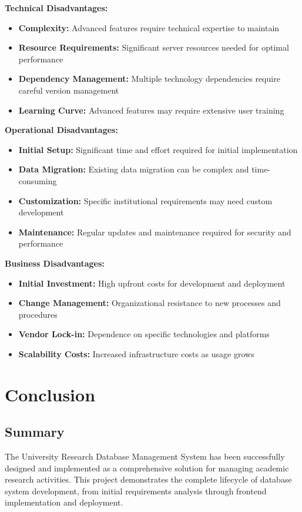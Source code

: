 \documentclass[12pt,a4paper]{article}
\begin{document}
\textbf{Technical Disadvantages:}
\begin{itemize}
    \item \textbf{Complexity:} Advanced features require technical expertise to maintain
    \item \textbf{Resource Requirements:} Significant server resources needed for optimal performance
    \item \textbf{Dependency Management:} Multiple technology dependencies require careful version management
    \item \textbf{Learning Curve:} Advanced features may require extensive user training
\end{itemize}

\textbf{Operational Disadvantages:}
\begin{itemize}
    \item \textbf{Initial Setup:} Significant time and effort required for initial implementation
    \item \textbf{Data Migration:} Existing data migration can be complex and time-consuming
    \item \textbf{Customization:} Specific institutional requirements may need custom development
    \item \textbf{Maintenance:} Regular updates and maintenance required for security and performance
\end{itemize}

\textbf{Business Disadvantages:}
\begin{itemize}
    \item \textbf{Initial Investment:} High upfront costs for development and deployment
    \item \textbf{Change Management:} Organizational resistance to new processes and procedures
    \item \textbf{Vendor Lock-in:} Dependence on specific technologies and platforms
    \item \textbf{Scalability Costs:} Increased infrastructure costs as usage grows
\end{itemize}

\section{Conclusion}

\subsection{Summary}
The University Research Database Management System has been successfully designed and implemented as a comprehensive solution for managing academic research activities. This project demonstrates the complete lifecycle of database system development, from initial requirements analysis through frontend implementation and deployment.
\end{document}
